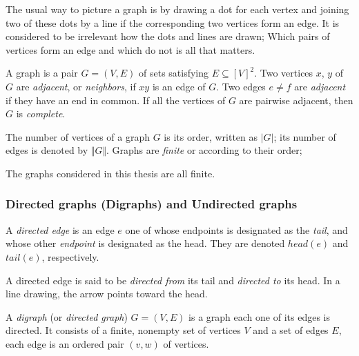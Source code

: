 The usual way to picture a graph is by drawing a dot for each vertex and joining two of these dots by a line if the corresponding two vertices form an edge.
It is considered to be irrelevant how the dots and lines are drawn;
Which pairs of vertices form an edge and which do not is all that matters.

\begin{definition}\label{definition:ofadjacentneighborvertices}
	A graph is a pair $ G = \left(V, E \right) $ of sets satisfying $ E \subseteq \left[ V \right]^2 $.
	Two vertices $ x $, $ y $ of $ G $ are \textit{adjacent}, or \textit{neighbors}, if $ xy $ is an edge of $ G $. Two edges $ e \neq f $ are \textit{adjacent} if they have an end in common. If all the vertices of $ G $ are pairwise adjacent, then $ G $ is \textit{complete}.
\end{definition}

\begin{definition}\label{definition:oftheorderofagraph}
	The number of vertices of a graph $ G $ is its order, written as $ \vert G \vert $;
	its number of edges is denoted by $ \Vert G \Vert $.
	Graphs are \textit{finite} or  according to their order;
\end{definition}

The graphs considered in this thesis are all finite.

\subsubsection{Directed graphs (Digraphs) and Undirected graphs} \label{subsubsection:LiteratureReview/ShortreviewofGraphTheoryconcepts/Graphs/DirectedgraphsDigraphsandUndirectedgraphs}
\begin{definition}\label{definition:ofdirectededges}
	A \textit{directed edge} is an edge $ e $ one of whose endpoints is designated as the \textit{tail}, and whose other \textit{endpoint} is designated as the head. They are denoted $ head\left(e\right) $ and $ tail\left(e\right) $, respectively.
	
	A directed edge is said to be \textit{directed from} its tail and \textit{directed to} its head. In a line drawing, the arrow points toward the head.
\end{definition}

\begin{definition}\label{definition:ofdigraphsordirectedgraphs}
	A \textit{digraph} (or \textit{directed graph}) $ G = \left(V, E\right) $ is a graph each one of its edges is directed. It consists of a finite, nonempty set of vertices $ V $ and a set of edges $ E $, each edge is an ordered pair $ \left(v, w\right) $ of vertices. 
\end{definition}

